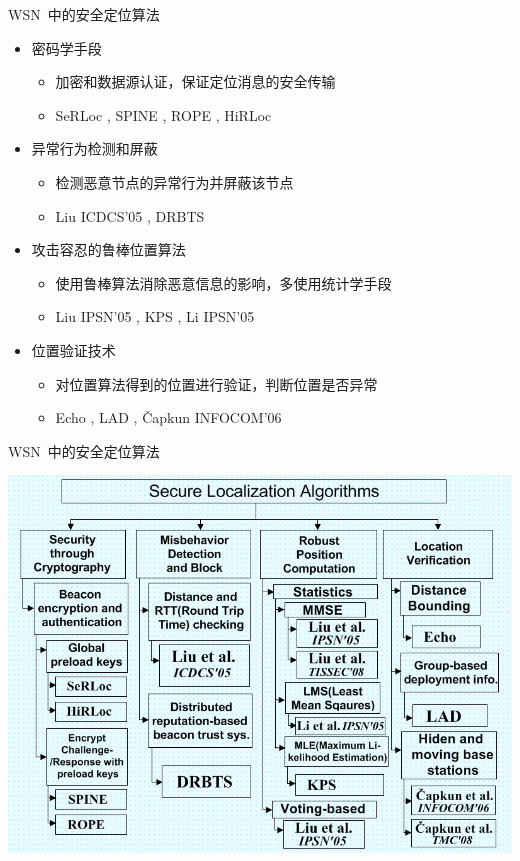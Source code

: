 \documentclass[mathserif,compress,CJKutf8, red]{beamer}
\begin{document}
\begin{CJK*}{UTF8}{song}
\begin{frame}{WSN~中的安全定位算法}
\begin{itemize}
\item 密码学手段
\begin{itemize}
\item 加密和数据源认证，保证定位消息的安全传输
\item SeRLoc \cite{Lazos2005}, SPINE \cite{Capkun2005, Capkun2006}, ROPE \cite{Lazos2006}, HiRLoc \cite{Lazos2005a}
\end{itemize}
\item 异常行为检测和屏蔽
\begin{itemize}
\item 检测恶意节点的异常行为并屏蔽该节点
\item Liu ICDCS'05 \cite{Liu2005c}, DRBTS \cite{Srinivasan2006}
\end{itemize}
\item 攻击容忍的鲁棒位置算法
\begin{itemize}
\item 使用鲁棒算法消除恶意信息的影响，多使用统计学手段
\item Liu IPSN'05 \cite{Liu2005b}, KPS \cite{Fang2005}, Li IPSN'05 \cite{Li2005a}
\end{itemize}
\item 位置验证技术
\begin{itemize}
\item 对位置算法得到的位置进行验证，判断位置是否异常
\item Echo \cite{Sastry2003}, LAD \cite{Du2006}, \v{C}apkun INFOCOM'06 \cite{Capkun2006a, Capkun2008}
\end{itemize}
\end{itemize}
\end{frame}

\begin{frame}{WSN~中的安全定位算法}
\centerline{\includegraphics[width=.8\textwidth]{images/wsn_sec_pos.png}}
\end{frame}


\end{CJK*}
\end{document}
